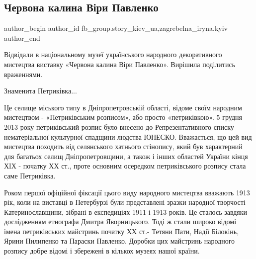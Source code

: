 
 
 
 
 

\subsection{Червона калина Віри Павленко}
\label{sec:22_02_2023.fb.fb_group.story_kiev_ua.1.chervona_kalina_v_ri}
 
\ifcmt
 author_begin
   author_id fb_group.story_kiev_ua,zagrebelna_iryna.kyiv
 author_end
\fi

Відвідали в національному музеї українського народного декоративного мистецтва
виставку «Червона калина Віри Павленко». Вирішила поділитись враженнями.

Знаменита Петриківка...

Це селище міського типу в Дніпропетровській області, відоме своїм народним
мистецтвом - «Петриківським розписом», або просто «петриківкою». 5 грудня
2013 року петриківський розпис було внесено до Репрезентативного списку
нематеріальної культурної спадщини людства ЮНЕСКО. Вважається, що цей вид
мистецтва походить від селянського хатнього стінопису, який був характерний
для багатьох селищ Дніпропетровщини, а також і інших областей України кінця
ХІХ - початку ХХ ст., проте основним осередком  петриківського розпису стала
саме Петриківка.

Роком першої офіційної фіксації цього виду народного мистецтва вважають 1913
рік, коли на виставці в Петербурзі були представлені зразки народної
творчості Катеринославщини, зібрані в експедиціях 1911 і 1913 років. Це
сталось завдяки дослідженням етнографа Дмитра Яворницького. Тоді ж стали
широко відомі імена петриківських майстринь початку ХХ ст.- Тетяни Пати,
Надії Білокінь, Ярини Пилипенко та Параски Павленко. Доробки цих майстринь
народного розпису добре відомі і збережені в кількох музеях нашої країни.

